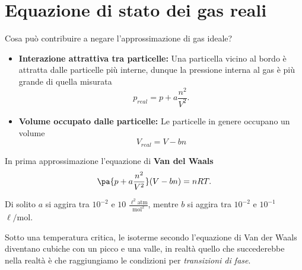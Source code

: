 \section{Equazione di stato dei gas reali}
Cosa pu\`o contribuire a negare l'approssimazione di gas ideale?
\begin{itemize}
\item \textbf{Interazione attrattiva tra particelle:} Una particella vicino al bordo \`e attratta dalle particelle pi\`u interne, dunque la pressione interna al gas \`e pi\`u grande di quella misurata 
\[p_{real}=p+a\frac {n^2}{V^2}.\]
\item \textbf{Volume occupato dalle particelle:} Le particelle in genere occupano un volume
\[V_{real}=V-bn\]
\end{itemize}
\begin{fact}
In prima approssimazione l'equazione di \textbf{Van del Waals}
\[\pa{p+a \frac{n^2}{V^2}}(V-bn)=nRT.\]
\end{fact}
\begin{remark}
Di solito $a$ si aggira tra $10^{-2}$ e $10$ $\displaystyle\frac{\ell^2\mathrm{atm}}{\mathrm{mol}^2}$, mentre $b$ si aggira tra $10^{-2}$ e $10^{-1}$ $\ell/\mathrm{mol}$.
\end{remark}

\noindent
Sotto una temperatura critica, le isoterme secondo l'equazione di Van der Waals diventano cubiche con un picco e una valle, in realt\`a quello che succederebbe nella realt\`a \`e che raggiungiamo le condizioni per \textit{transizioni di fase}.